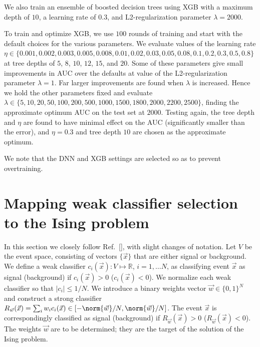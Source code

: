 We  also train an ensemble of boosted decision trees using XGB \cite{xgboost}
with a maximum depth of $10$, a learning rate of $0.3$, and L2-regularization parameter $\lambda=2000$. 

To train and optimize XGB, we use $100$ rounds of training and start with the default choices for the various parameters. We  evaluate values of the learning rate\\ 
\noindent $\eta\in\{0.001,0.002,0.003,0.005,0.008,0.01,0.02,0.03,0.05,0.08,0.1,0.2,0.3,0.5,0.8\}$
at tree depths of $5$, $8$, $10$, $12$, $15$, and $20$. Some of these parameters give small improvements in AUC over the defaults at value of the L2-regularization parameter $\lambda=1$. Far larger improvements are found when $\lambda$ is increased.  Hence  we hold the other parameters fixed and  evaluate $\lambda\in\{5,10,20,50,100,200,500,1000,1500,1800,2000,2200,2500\}$, finding the approximate optimum AUC on the test set at $2000$. Testing again, the tree depth and $\eta$ are  found to have minimal effect on the AUC (significantly smaller than the error), and $\eta=0.3$ and tree depth $10$ are  chosen as the approximate optimum. 

We note that the DNN and XGB settings are selected so as to prevent overtraining. 



\section{Mapping weak classifier selection to the Ising problem}
In this section we closely follow Ref.~[], with slight changes of notation. Let $V$ be the event space, consisting of vectors $\{\vec{x}\}$ that are either signal or background. We define a weak classifier $c_i(\vec{x}):V\mapsto \mathbb{R}$, $i=1,\dots N$, as classifying event $\vec{x}$ as signal (background) if $c_i(\vec{x})>0$ ($c_i(\vec{x})<0$). We normalize each weak classifier so that $|c_i|\leq 1/N$. We introduce a binary weights vector $\vec{w} \in \{0,1\}^N$ and construct a strong classifier $R_{\vec{w}}(\vec{x}) = \sum_i w_i c_i(\vec{x})\in[-{\norm{\vec{w}}}/{N},{\norm{\vec{w}}}/{N}]$. The event $\vec{x}$ is correspondingly classified as signal (background) if $R_{\vec{w}}(\vec{x})>0$ ($R_{\vec{w}}(\vec{x})<0$). The weights $\vec{w}$ are to be determined; they are the target of the solution of the Ising problem.

